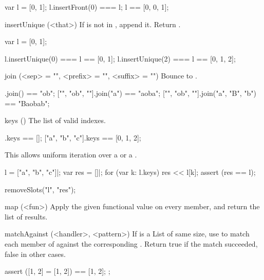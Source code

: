 \begin{urbiscriptapi}
\begin{urbiassert}
var l = [0, 1];
l.insertFront(0) === l;
l == [0, 0, 1];
\end{urbiassert}


\item[insertUnique](<that>)%
  If \that is not in \this, append it. Return \this.

\begin{urbiassert}
var l = [0, 1];

l.insertUnique(0) === l == [0, 1];
l.insertUnique(2) === l == [0, 1, 2];
\end{urbiassert}


\item[join](<sep> = "", <prefix> = "", <suffix> = "")%
  Bounce to .

\begin{urbiassert}
["", "ob", ""].join()              == "ob";
["", "ob", ""].join("a")           == "aoba";
["", "ob", ""].join("a", "B", "b") == "Baobab";
\end{urbiassert}


\item[keys]()%
  The list of valid indexes.
\begin{urbiassert}
[].keys == [];
["a", "b", "c"].keys == [0, 1, 2];
\end{urbiassert}

This allows uniform iteration over a  or a
.

\begin{urbiscript}
l = ["a", "b", "c"]|;
var res = []|;
for (var k: l.keys)
  res << l[k];
assert (res == l);
\end{urbiscript}
\begin{urbicomment}
removeSlots("l", "res");
\end{urbicomment}


\item[map](<fun>)%
  Apply the given functional value on every member, and return the list of
  results.



\item[matchAgainst](<handler>, <pattern>)%
  If  is a List of same size, use  to match each
  member of \this against the corresponding .  Return true if
  the match succeeded, false in other cases.
\begin{urbiscript}
assert
{
  ([1, 2] = [1, 2]) == [1, 2];
};


\end{urbiscript}
\end{urbiscriptapi}
